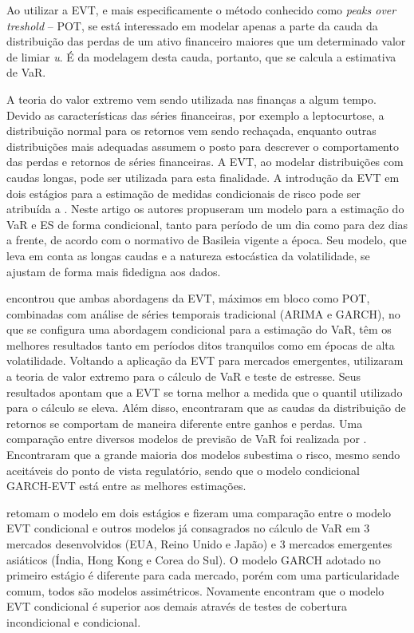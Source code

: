 \documentclass[1p]{elsarticle}
\theoremstyle{definition}
\begin{document}
Ao utilizar a EVT, e mais especificamente o método conhecido como \emph{peaks over treshold} – POT, se está interessado em modelar apenas a parte da cauda da distribuição das perdas de um ativo financeiro maiores que um determinado valor de limiar \emph{u}. É da modelagem desta cauda, portanto, que se calcula a estimativa de VaR.

A teoria do valor extremo vem sendo utilizada nas finanças a algum tempo. Devido as características das séries financeiras, por exemplo a leptocurtose, a distribuição normal para os retornos vem sendo rechaçada, enquanto outras distribuições mais adequadas assumem o posto para descrever o comportamento das perdas e retornos de séries financeiras. A EVT, ao modelar distribuições com caudas longas, pode ser utilizada para esta finalidade. A introdução da EVT em dois estágios para a estimação de medidas condicionais de risco pode ser atribuída a \cite{McNeil2000}. Neste artigo os autores propuseram um modelo para a estimação do VaR e ES de forma condicional, tanto para período de um dia como para dez dias a frente, de acordo com o normativo de Basileia vigente a época. Seu modelo, que leva em conta as longas caudas e a natureza estocástica da volatilidade, se ajustam de forma mais fidedigna aos dados.

\cite{Bystroem2004} encontrou que ambas abordagens da EVT, máximos em bloco como POT, combinadas com análise de séries temporais tradicional (ARIMA e GARCH), no que se configura uma abordagem condicional para a estimação do VaR, têm os melhores resultados tanto em períodos ditos tranquilos como em épocas de alta volatilidade. Voltando a aplicação da EVT para mercados emergentes, \cite{Gencay2004} utilizaram a teoria de valor extremo para o cálculo de VaR e teste de estresse. Seus resultados apontam que a EVT se torna melhor a medida que o quantil utilizado para o cálculo se eleva. Além disso, encontraram que as caudas da distribuição de retornos se comportam de maneira diferente entre ganhos e perdas. Uma comparação entre diversos modelos de previsão de VaR foi realizada por \cite{Kuester2006}. Encontraram que a grande maioria dos modelos subestima o risco, mesmo sendo aceitáveis do ponto de vista regulatório, sendo que o modelo condicional GARCH-EVT está entre as melhores estimações.


\cite{Karmakar2014} retomam o modelo em dois estágios e fizeram uma comparação entre o modelo EVT condicional e outros modelos já consagrados no cálculo de VaR em 3 mercados desenvolvidos (EUA, Reino Unido e Japão) e 3 mercados emergentes asiáticos (Índia, Hong Kong e Corea do Sul). O modelo GARCH adotado no primeiro estágio é diferente para cada mercado, porém com uma particularidade comum, todos são modelos assimétricos. Novamente encontram que o modelo EVT condicional é superior aos demais através de testes de cobertura incondicional e condicional.
\end{document}
